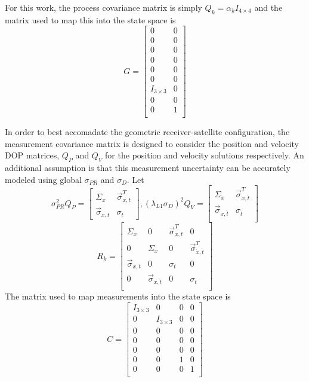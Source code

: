 For this work, the process covariance matrix is simply $Q_k = \alpha_kI_{4\times4}$ and the matrix used to map this into the state space is
\begin{equation}
G = \left[
\begin{array}{cc}
0 & 0\\
0 & 0\\
0 & 0\\
0 & 0\\
0 & 0\\
0 & 0\\
I_{3\times3} & 0\\
0 & 0\\
0 & 1\\
\end{array}
\right]
\end{equation}

In order to best accomadate the geometric receiver-satellite configuration, the measurement covariance matrix is designed to consider the position and velocity DOP matrices, $Q_P$ and $Q_V$ for the position and velocity solutions respectively.  An additional assumption is that this measurement uncertainty can be accurately modeled using global $\sigma_{PR}$ and $\sigma_{D}$.  
Let 
\begin{equation}
\sigma_{PR}^2Q_P = 
\left[
\begin{array}{cc}
\Sigma_x & \vec{\sigma}_{x,t}^T\\
\vec{\sigma}_{x,t} & \sigma_t
\end{array}
\right],
(\lambda_{L1}\sigma_D)^2Q_V = \left[
\begin{array}{cc}
\Sigma_{\dot{x}} & \vec{\sigma}_{\dot{x},\dot{t}}^T\\
\vec{\sigma}_{\dot{x},
\dot{t}} & \sigma_{\dot{t}}\\
\end{array}
\right]
\end{equation}
\begin{equation}
R_k = \left[
\begin{array}{cccc}
\Sigma_x & 0 & \vec{\sigma}_{x,t}^T & 0\\
0 & \Sigma_{\dot{x}} & 0 & \vec{\sigma}_{\dot{x},\dot{t}}^T\\
\vec{\sigma}_{x,t} & 0 & \sigma_t & 0\\
0 & \vec{\sigma}_{\dot{x},\dot{t}} & 0& \sigma_{\dot{t}}\\
\end{array}
\right]
\end{equation}
The matrix used to map measurements into the state space is
\begin{equation}
C = \left[
\begin{array}{cccc}
I_{3\times3} & 0 & 0 & 0\\
0 & I_{3\times3} & 0 & 0\\
0 & 0 & 0 & 0\\
0 & 0 & 0 & 0\\
0 & 0 & 0 & 0\\
0 & 0 & 1 & 0\\
0 & 0 & 0 & 1\\
\end{array}
\right]
\end{equation}

